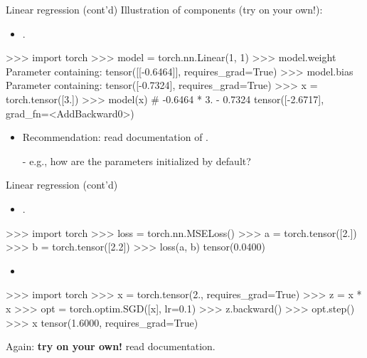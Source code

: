 \begin{frame}[fragile]{Linear regression (cont'd)}
\vspace{-6mm}
Illustration of components (try on your own!):
\begin{itemize}
\item {}.
\end{itemize}
\begin{python}
>>> import torch
>>> model = torch.nn.Linear(1, 1)
>>> model.weight
Parameter containing:
tensor([[-0.6464]], requires_grad=True)
>>> model.bias
Parameter containing:
tensor([-0.7324], requires_grad=True)
>>> x = torch.tensor([3.])
>>> model(x)
  # -0.6464 * 3. - 0.7324
tensor([-2.6717], grad_fn=<AddBackward0>)
\end{python}
\begin{itemize}
\item Recommendation: read documentation of .
\item[-] e.g., how are the parameters initialized by default? 
\end{itemize}

\end{frame}

\begin{frame}[fragile]{Linear regression (cont'd)}
\vspace{-6mm}
\begin{itemize}
\item {}.
\end{itemize}
\begin{python}
>>> import torch
>>> loss = torch.nn.MSELoss()
>>> a = torch.tensor([2.])
>>> b = torch.tensor([2.2])
>>> loss(a, b)
tensor(0.0400)
\end{python}
\begin{itemize}
\item {}
\end{itemize}
\begin{python}
>>> import torch
>>> x = torch.tensor(2., requires_grad=True)
>>> z = x * x
>>> opt = torch.optim.SGD([x], lr=0.1)
>>> z.backward()
>>> opt.step()
>>> x
tensor(1.6000, requires_grad=True)
\end{python}
Again: \textbf{try on your own!} read documentation.
\end{frame}

